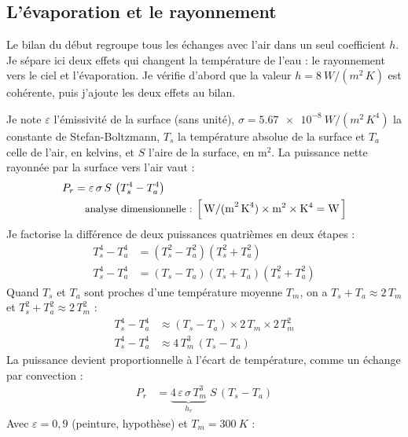 \subsection{L'évaporation et le rayonnement}

Le bilan du début regroupe tous les échanges avec l'air dans un seul coefficient $h$. Je sépare ici deux effets qui changent la température de l'eau : le rayonnement vers le ciel et l'évaporation. Je vérifie d'abord que la valeur $h = \qty{8}{W/(m^2\,K)}$ est cohérente, puis j'ajoute les deux effets au bilan.

\begin{demonstration}
Je note $\varepsilon$ l'émissivité de la surface (sans unité), $\sigma = \qty{5,67e-8}{W/(m^2\,K^4)}$ la constante de Stefan-Boltzmann, $T_s$ la température absolue de la surface et $T_a$ celle de l'air, en kelvins, et $S$ l'aire de la surface, en m$^2$. La puissance nette rayonnée par la surface vers l'air vaut :
\begin{align*}
P_r &= \varepsilon\,\sigma\,S\,\left(T_s^4 - T_a^4\right)\\
\dimline{\unit{W/(m^2\,K^4)}\times\unit{m^2}\times\unit{K^4}=\unit{W}}
\end{align*}
Je factorise la différence de deux puissances quatrièmes en deux étapes :
\begin{align*}
T_s^4 - T_a^4 &= \left(T_s^2 - T_a^2\right)\left(T_s^2 + T_a^2\right)\\
T_s^4 - T_a^4 &= \left(T_s - T_a\right)\left(T_s + T_a\right)\left(T_s^2 + T_a^2\right)
\end{align*}
Quand $T_s$ et $T_a$ sont proches d'une température moyenne $T_m$, on a $T_s + T_a \approx 2\,T_m$ et $T_s^2 + T_a^2 \approx 2\,T_m^2$ :
\begin{align*}
T_s^4 - T_a^4 &\approx \left(T_s - T_a\right) \times 2\,T_m \times 2\,T_m^2\\
T_s^4 - T_a^4 &\approx 4\,T_m^3\,\left(T_s - T_a\right)
\end{align*}
La puissance devient proportionnelle à l'écart de température, comme un échange par convection :
\begin{align*}
P_r &= \underbrace{4\,\varepsilon\,\sigma\,T_m^3}_{h_r}\; S\,\left(T_s - T_a\right)
\end{align*}
Avec $\varepsilon = 0{,}9$ (peinture, hypothèse) et $T_m = \qty{300}{K}$ :

\end{demonstration}
